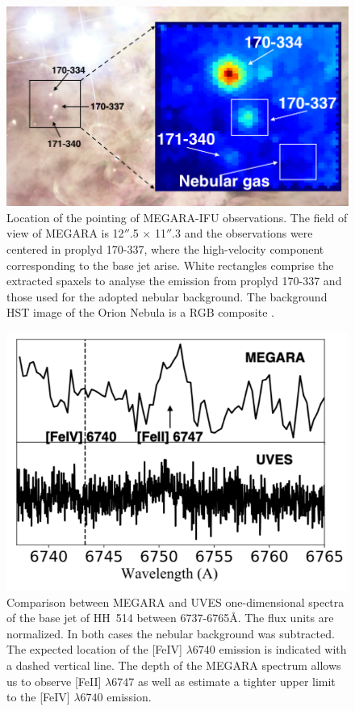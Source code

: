 \documentclass[fleqn,usenatbib]{mnras}
\begin{document}
\begin{figure}
\includegraphics[width=\columnwidth]{MEGARA_IFU.png}
\caption{ Location of the pointing of MEGARA-IFU observations. The field of view of MEGARA is 12$''$.5 $\times$ 11$''$.3 and the observations were centered in proplyd 170-337, where the high-velocity component corresponding to the base jet arise. White rectangles comprise the extracted spaxels to analyse the emission from proplyd 170-337 and those used for the adopted nebular background. The background HST image of the Orion Nebula is a RGB composite  \citep[Red: ACS F658N+F775W+F850LP; Green: ACS F555W; Blue: ACS F435W,][]{Robberto:2013a}.}
\label{fig:megara}
\end{figure}



\begin{figure}
\includegraphics[width=\columnwidth]{megara_UVES.png}
\caption{Comparison between MEGARA and UVES one-dimensional spectra of the base jet of HH~514 between 6737-6765\AA. The flux units are normalized. In both cases the nebular background was subtracted. The expected location of the [Fe\thinspace IV] $\lambda 6740$ emission is indicated with a dashed vertical line. The depth of the MEGARA spectrum allows us to observe [Fe\thinspace II] $\lambda 6747$ as well as estimate a tighter upper limit to the [Fe\thinspace IV] $\lambda 6740$  emission.  }
\label{fig:megara_vs_UVES}
\end{figure}
\end{document}
